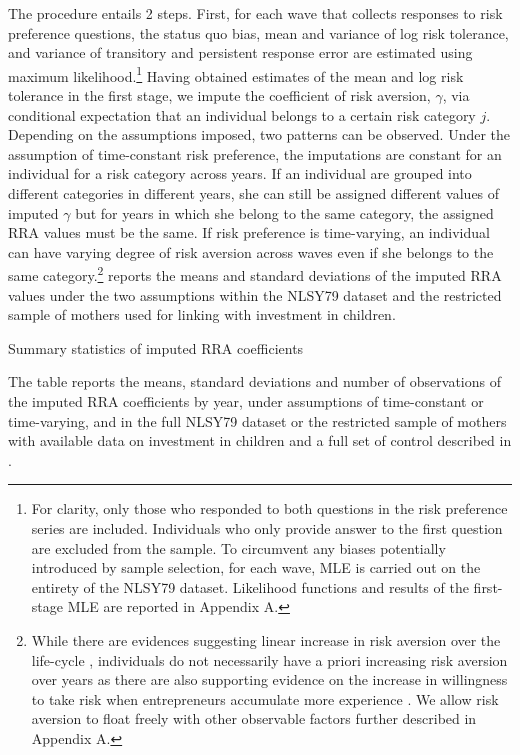 \documentclass[emulatestandardclasses, 10pt, abstract = true]{scrartcl}
\begin{document}
The procedure entails 2 steps. First, for each wave that collects responses to risk preference questions, the status quo bias, mean and variance of log risk tolerance, and variance of transitory and persistent response error are estimated using maximum likelihood.\footnote{For clarity, only those who responded to both questions in the risk preference series are included. Individuals who only provide answer to the first question are excluded from the sample. To circumvent any biases potentially introduced by sample selection, for each wave, MLE is carried out on the entirety of the NLSY79 dataset. Likelihood functions and results of the first-stage MLE are reported in \alert{Appendix A}.} Having obtained estimates of the mean and log risk tolerance in the first stage, we impute the coefficient of risk aversion, $\gamma$, via conditional expectation that an individual belongs to a certain risk category $j$. Depending on the assumptions imposed, two patterns can be observed. Under the assumption of time-constant risk preference, the imputations are constant for an individual for a risk category across years. If an individual are grouped into different categories in different years, she can still be assigned different values of imputed $\gamma$ but for years in which she belong to the same category, the assigned RRA values must be the same. If risk preference is time-varying, an individual can have varying degree of risk aversion across waves even if she belongs to the same category.\footnote{While there are evidences suggesting linear increase in risk aversion over the life-cycle \citep{dohmen2017risk}, individuals do not necessarily have a priori increasing risk aversion over years as there are also supporting evidence on the increase in willingness to take risk when entrepreneurs accumulate more experience  \citep{brachert2017simultaneity,cho2021endogenous}. We allow risk aversion to float freely with other observable factors further described in \alert{Appendix A}.}  reports the means and standard deviations of the imputed RRA values under the two assumptions within the NLSY79 dataset and the restricted sample of mothers used for linking with investment in children.

\begin{table}
	\centering
	\setlength{\extrarowheight}{0.3em}
	\begin{threeparttable}
		\caption{Summary statistics of imputed RRA coefficients}	
		
		\label{table:CRRA-summary}
	\begin{tablenotes}[flushleft]\footnotesize
		\item The table reports the means, standard deviations and number of observations of the imputed RRA coefficients by year, under assumptions of time-constant or time-varying, and in the full NLSY79 dataset or the restricted sample of mothers with available data on investment in children and a full set of control described in .
	\end{tablenotes}
	\end{threeparttable}
\end{table}    
\end{document}
